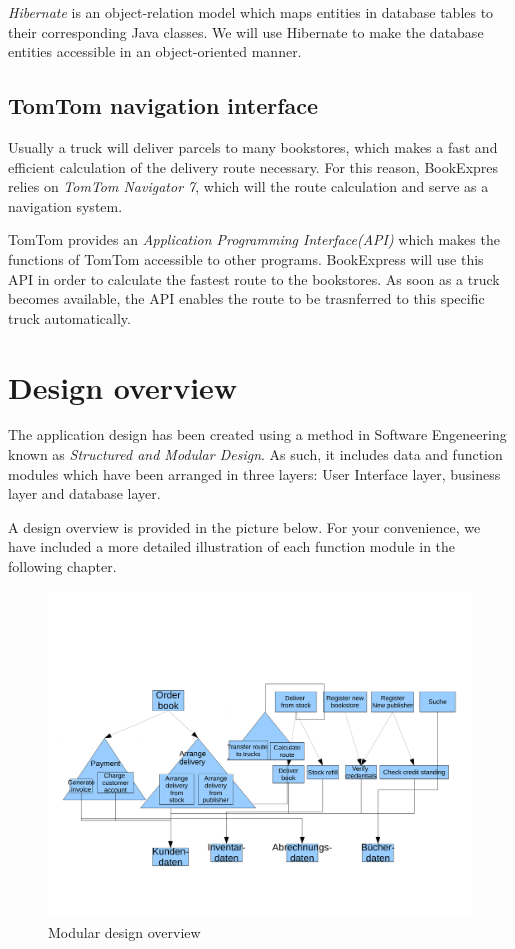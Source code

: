 \emph{Hibernate} is an object-relation model which maps entities in database tables to their corresponding Java classes. We will use Hibernate to make the database entities accessible in an object-oriented manner.
\section{TomTom navigation interface}
Usually a truck will deliver parcels to many bookstores, which makes a fast and efficient calculation of the delivery route necessary. For this reason, BookExpres relies on \emph{TomTom Navigator 7}, which will the route calculation and serve as a navigation system.

TomTom provides an \emph{Application Programming Interface(API)} which makes the functions of TomTom accessible to other programs. BookExpress will use this API in order to calculate the fastest route to the bookstores. As soon as a truck becomes available, the API enables the route to be trasnferred to this specific truck automatically.
\chapter{Design overview}
The application design has been created using a method in Software Engeneering known as \emph{Structured and Modular Design}. As such, it includes data and function modules which have been arranged in three layers: User Interface layer, business layer and database layer.

A design overview is provided in the picture below. For your convenience, we have included a more detailed illustration of each function module in the following chapter.

\begin{figure}[H]
\centering
\includegraphics[scale=0.5]{design.pdf}
\caption{Modular design overview}
\end{figure}



